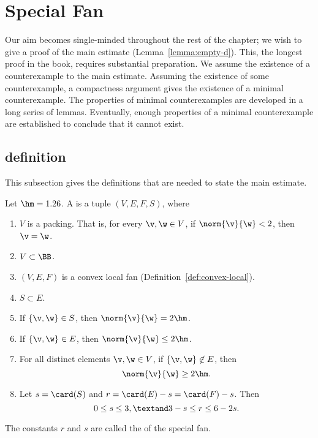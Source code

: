 \section{Special Fan}\label{sec:weight}  

Our aim becomes single-minded throughout the rest of the chapter; we
wish to give a proof of the main estimate (Lemma~\ref{lemma:empty-d}).
This,  the longest proof in the book,  requires substantial
preparation.  We  assume the existence of a counterexample to the
main estimate.  Assuming the existence of some counterexample, a
compactness argument gives the existence of a minimal counterexample.
The properties of minimal counterexamples are developed in a long
series of lemmas.  Eventually, enough properties of a minimal
counterexample are established to conclude that it cannot exist.




\subsection{definition}

This subsection gives the definitions that are needed to state the
main estimate.

\begin{definition}
Let $\hm = 1.26$.
A  is a tuple $(V,E,F,S)$, where
\begin{enumerate}
\item {} $V$ is a packing.  That is, for every $\v,\w\in
V$, if $\norm{\v}{\w}<2$, then $\v=\w$.
\item {} $V\subset \BB$.
\item {} $(V,E,F)$ is a convex local fan (Definition~\ref{def:convex-local}).
\item {} $S\subset E$.
\item {} If $\{\v,\w\}\in S$, then $\norm{\v}{\w}=2\hm$.
\item {} If $\{\v,\w\}\in E$, then $\norm{\v}{\w}\le 2\hm$.
\item {} For all distinct elements $\v,\w\in V$, if
$\{\v,\w\}\not\in E$, then \[ \norm{\v}{\w}\ge
2\hm.\] 
\item {} %
Let      $s=\card(S)$ and $r=\card(E) - s = \card(F)-s$.  Then
\[ 0\le s \le 3,\textand 3-s \le r \le 6 -
2s.\] 
\end{enumerate}
The constants $r$ and $s$ are called the  of the special fan.
\end{definition}


